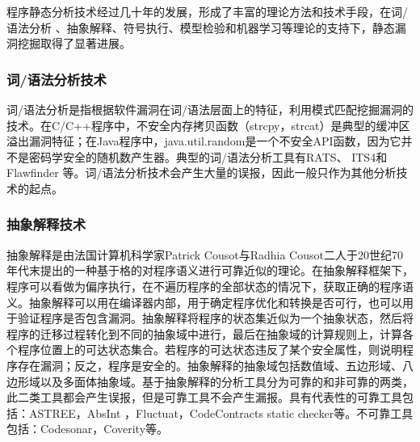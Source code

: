 
程序静态分析技术经过几十年的发展，形成了丰富的理论方法和技术手段，在词/语法分析
、抽象解释、符号执行、模型检验和机器学习等理论的支持下，静态漏洞挖掘取得了显著进展。

\subsubsection{词/语法分析技术}

词/语法分析是指根据软件漏洞在词/语法层面上的特征，利用模式匹配挖掘漏洞的技术。在C/C++程序中，不安全内存拷贝函数（strcpy，strcat）是典型的缓冲区溢出漏洞特征；在Java程序中，java.util.random是一个不安全API函数，因为它并不是密码学安全的随机数产生器。典型的词/语法分析工具有RATS、 ITS4和Flawfinder 等。词/语法分析技术会产生大量的误报，因此一般只作为其他分析技术的起点。

%

\subsubsection{抽象解释技术}

抽象解释是由法国计算机科学家Patrick Cousot与Radhia Cousot二人于20世纪70年代末提出的一种基于格的对程序语义进行可靠近似的理论。在抽象解释框架下，程序可以看做为偏序执行，在不遍历程序的全部状态的情况下，获取正确的程序语义。抽象解释可以用在编译器内部，用于确定程序优化和转换是否可行，也可以用于验证程序是否包含漏洞。抽象解释将程序的状态集近似为一个抽象状态，然后将程序的迁移过程转化到不同的抽象域中进行，最后在抽象域的计算规则上，计算各个程序位置上的可达状态集合。若程序的可达状态违反了某个安全属性，则说明程序存在漏洞；反之，程序是安全的。抽象解释的抽象域包括数值域、五边形域、八边形域以及多面体抽象域。基于抽象解释的分析工具分为可靠的和非可靠的两类，此二类工具都会产生误报，但是可靠工具不会产生漏报。具有代表性的可靠工具包括：ASTREE，AbsInt ，Fluctuat，CodeContracts static checker等。不可靠工具包括：Codesonar，Coverity等。

